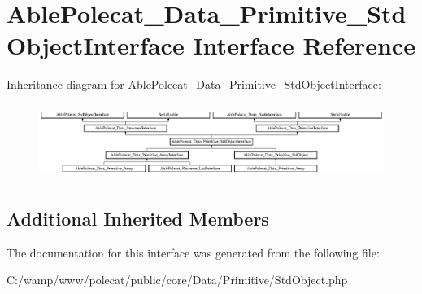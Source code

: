 \hypertarget{interface_able_polecat___data___primitive___std_object_interface}{}\section{Able\+Polecat\+\_\+\+Data\+\_\+\+Primitive\+\_\+\+Std\+Object\+Interface Interface Reference}
\label{interface_able_polecat___data___primitive___std_object_interface}
Inheritance diagram for Able\+Polecat\+\_\+\+Data\+\_\+\+Primitive\+\_\+\+Std\+Object\+Interface\+:\begin{figure}[H]
\begin{center}
\leavevmode
\includegraphics[height=2.430556cm]{interface_able_polecat___data___primitive___std_object_interface}
\end{center}
\end{figure}
\subsection*{Additional Inherited Members}


The documentation for this interface was generated from the following file\+:\begin{DoxyCompactItemize}
\item 
C\+:/wamp/www/polecat/public/core/\+Data/\+Primitive/Std\+Object.\+php\end{DoxyCompactItemize}
